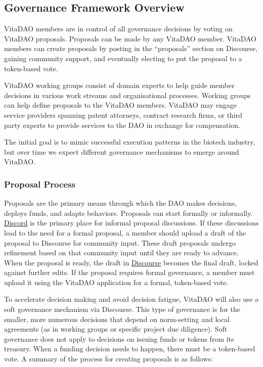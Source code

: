 \documentclass[10pt,letterpaper]{article}
\begin{document}
\subsection{Governance Framework Overview}
VitaDAO members are in control of all governance decisions by voting on VitaDAO proposals. Proposals can be made by any VitaDAO member. VitaDAO members can create proposals by posting in the “proposals” section on Discourse, gaining community support, and eventually electing to put the proposal to a token-based vote. 

VitaDAO working groups consist of domain experts to help guide member decisions in various work streams and organisational processes. Working groups can help define proposals to the VitaDAO members. VitaDAO may engage service providers spanning patent attorneys, contract research firms, or third party experts to provide services to the DAO in exchange for compensation.

The initial goal is to mimic successful execution patterns in the biotech industry, but over time we expect different governance mechanisms to emerge around VitaDAO.

\subsubsection{Proposal Process}
Proposals are the primary means through which the DAO makes decisions, deploys funds, and adapts behaviors. Proposals can start formally or informally. \href{https://github.com/discord}{Discord} is the primary place for informal proposal discussions. If these discussions lead to the need for a formal proposal, a member should upload a draft of the proposal to Discourse for community input. These draft proposals undergo refinement based on that community input until they are ready to advance. When the proposal is ready, the draft in \href{https://github.com/discourse/discourse}{Discourse} becomes the final draft, locked against further edits. If the proposal requires formal governance, a member must upload it using the VitaDAO application for a formal, token-based vote. 

To accelerate decision making and avoid decision fatigue, VitaDAO will also use a soft governance mechanism via Discourse. This type of governance is for the smaller, more numerous decisions that depend on norm-setting and local agreements (as in working groups or specific project due diligence). Soft governance does not apply to decisions on issuing funds or tokens from its treasury. When a funding decision needs to happen, there must be a token-based vote. A summary of the process for creating proposals is as follows:
\end{document}
